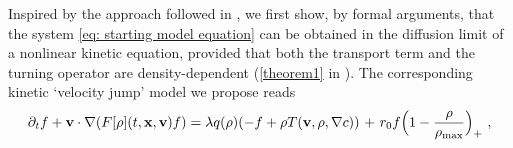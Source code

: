 \documentclass[review,onefignum,onetabnum]{siamart220329}
\begin{document}
Inspired by the approach followed in \cite{othmer2002diffusion,othmer2000diffusion}, we first show, by formal arguments, that the system \cref{eq: starting model equation} can be obtained in the diffusion limit of a nonlinear kinetic equation, provided that both the transport term and the turning operator are density-dependent { (\cref{theorem1} in )}. The corresponding kinetic `velocity jump' model we propose reads 
\begin{equation}
    \partial_t f+\mathbf{v}\cdot \nabla(F[\rho](t,\mathbf{x},\mathbf{v}) f)= \lambda q(\rho)(-f+\rho T(\mathbf{v},\rho,\nabla c)) {\ +\ r_0f\Bigl(1-\frac{\rho}{\rho_{\textnormal{max}}} \Bigr)_+}\ ,\label{eq: inital model without scaling}

\end{equation}
\end{document}
